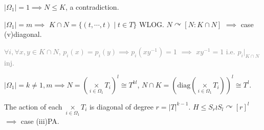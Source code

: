 \documentclass[a4paper,11pt]{article}
\begin{document}
$|\Omega_1|=1\implies N\leq K$, a contradiction.

$|\Omega_1|=m\implies$ $K\cap N=\{(t,\cdots,t)\mid t\in T\}$ WLOG.  $N\curvearrowright [N:K\cap N]$ $\implies$ case (v)diagonal.

\textcolor{gray}{$\forall i, \forall x, y \in K\cap N$, $p_i(x)=p_i(y)\implies p_i(xy^{-1})=1$ $\implies$ $xy^{-1}=1$ i.e. $p_i|_{K\cap N}$ inj. }


$|\Omega_1|=k\neq 1,m\implies N=\left(\mathop{\times}\limits_{i\in\Omega_1}T_i\right)^{l}\cong T^{kl}$, $N\cap K=\left(\mathrm{diag}\left(\mathop{\times}\limits_{i\in\Omega_1}T_i\right)\right)^l\cong T^l$.

The action of each $\mathop{\times}\limits_{i\in\Omega_1}T_i$ is diagonal of degree $r=|T|^{k-1}$. $H\leq S_r\wr S_l\curvearrowright [r]^l$ $\implies$ case (iii)PA.





\ifx\ChapTwoSecSix\undefined
     
\end{document}
